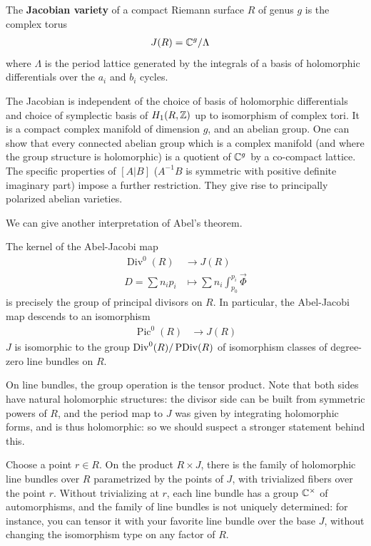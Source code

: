 \documentclass[12pt]{article}
\begin{document}
\begin{definition}
    The \textbf{Jacobian variety} of a compact Riemann surface $R$ of genus $g$ is the complex torus \begin{align*}
        J(R) & = \mathbb{C}^g / \Lambda
    \end{align*} where $\Lambda$ is the period lattice generated by the integrals of a basis of holomorphic differentials over the $a_i$ and $b_i$ cycles.
\end{definition}
The Jacobian is independent of the choice of basis of holomorphic differentials and choice of symplectic basis of $H_1(R, \mathbb{Z})$ up to isomorphism of complex tori. It is a compact complex manifold of dimension $g$, and an abelian group. One can show that every connected abelian group which is a complex manifold (and where the group structure is holomorphic) is a quotient of $\mathbb{C}^g$ by a co-compact lattice. The specific properties of $[A|B]$ ($A^{-1}B$ is symmetric with positive
definite imaginary part) impose a further restriction. They give rise to principally polarized abelian varieties.

We can give another interpretation of Abel's theorem.
\begin{theorem}
     The kernel of the Abel-Jacobi map \begin{align*}
        \operatorname{Div}^0(R) & \to J(R)                                     \\
        D = \sum n_i p_i        & \mapsto \sum n_i \int_{p_0}^{p_i} \vec{\Phi}
    \end{align*} is precisely the group of principal divisors on $R$. In particular, the Abel-Jacobi map descends to an isomorphism \begin{align*}
        \operatorname{Pic}^0(R) & \to J(R)
    \end{align*}
    $J$ is isomorphic to the group $\operatorname{Div}^0(R)/\operatorname{PDiv}(R)$ of isomorphism classes of
    degree-zero line bundles on $R$.
\end{theorem}


On line bundles, the group operation is the tensor product.
Note that both sides have natural holomorphic structures:
the divisor side can be built from symmetric powers of $R$,
and the period map to $J$ was given by integrating holomorphic forms,
and is thus holomorphic:
so we should suspect a stronger statement behind this.

Choose a point $r \in R$.
On the product $R \times J$, there is the family of holomorphic line bundles
over $R$ parametrized by the points of $J$, with trivialized fibers over the point $r$.
Without trivializing at $r$, each line bundle has a group $\mathbb{C}^\times$ of automorphisms,
and the family of line bundles is not uniquely determined:
for instance, you can tensor it with your favorite line bundle over the base $J$,
without changing the isomorphism type on any factor of $R$.
\end{document}
